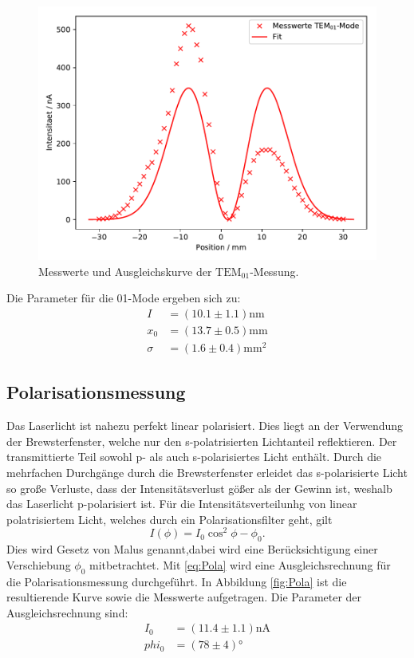 \begin{figure}[H]
  \centering
  \includegraphics{plots/M01.pdf}
  \caption{Messwerte und Ausgleichskurve der $\text{TEM}_{01}$-Messung.}
  \label{fig:M01}
\end{figure}
Die Parameter für die 01-Mode ergeben sich zu:
\begin{align*}
  I &= (10.1\pm1.1)\text{nm}\\
  x_0&=(13.7\pm0.5) \text{mm}\\
  \sigma &= (1.6\pm0.4) \text{mm}^{2}
\end{align*}
\subsection{Polarisationsmessung}
Das Laserlicht ist nahezu perfekt linear polarisiert. Dies liegt an der Verwendung der
Brewsterfenster, welche nur den s-polatrisierten Lichtanteil reflektieren. Der
transmittierte Teil sowohl p- als auch s-polarisiertes Licht enthält. Durch die
mehrfachen Durchgänge durch die Brewsterfenster erleidet das s-polarisierte Licht
so große Verluste, dass der Intensitätsverlust gößer als der Gewinn ist, weshalb
das Laserlicht p-polarisiert ist.
Für die Intensitätsverteilunhg von linear polatrisiertem Licht, welches durch ein
Polarisationsfilter geht, gilt
\begin{equation}
  I(\phi)=I_0 \cos^2{\phi-\phi_0} .
\end{equation}
Dies wird Gesetz von Malus genannt,dabei wird eine Berücksichtigung einer Verschiebung $\phi_0$
mitbetrachtet.
Mit \ref{eq:Pola} wird eine Ausgleichsrechnung für die Polarisationsmessung durchgeführt.
In Abbildung \ref{fig:Pola} ist die resultierende Kurve sowie die Messwerte aufgetragen.
Die Parameter der Ausgleichsrechnung sind:
\begin{align*}
  I_0&=(11.4 \pm 1.1)\text{nA} \\
  phi_0&=(78 \pm 4)°
\end{align*}
